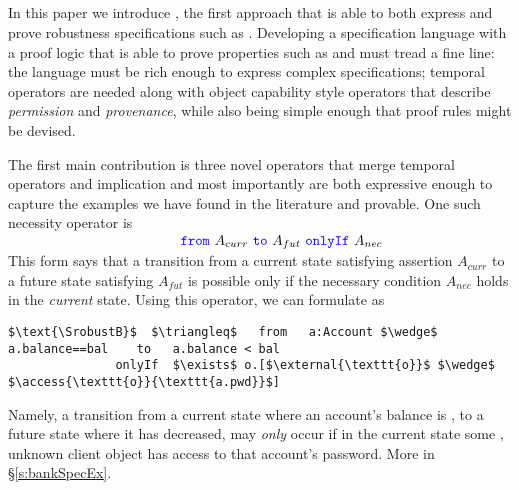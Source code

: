 \subsection{\Nec}
\label{intro:this:work}
{In this paper we introduce \Nec,} the first approach that is able to  both express and prove
robustness specifications such as  \SrobustB.
{Developing a specification language with a proof logic that is able to prove properties such as \SrobustB %
and must tread a fine line: the language must be rich enough to express complex specifications; temporal operators are needed along with object capability style operators 
that describe \emph{permission} and \emph{provenance}, while also being simple enough that proof rules might be devised.}


\vspace{.07in}
 {
The {first main} contribution  
{is} three novel operators that merge
temporal operators and implication 
and most importantly are both expressive enough to capture the 
examples we have found in the literature and provable.
}
%
%
%  
 One such necessity operator is \\
$ 
\strut \hspace{1.7in} {\color{blue}\texttt{from}}\ A_{curr}\ {\color{blue}\texttt{to}}\ A_{fut}\ {\color{blue}\texttt{onlyIf}}\ A_{nec}
$  
\\
This form says that  
a  {transition} from a current state satisfying assertion $A_{curr}$ to a future
state satisfying $A_{fut}$  is possible only if  the   necessary 
condition
$A_{nec}$ holds in the \emph{current} state.
Using this operator, 
we can formulate  \SrobustB  
as
\begin{lstlisting}[language = Chainmail, mathescape=true, frame=lines]
   $\text{\SrobustB}$  $\triangleq$   from   a:Account $\wedge$ a.balance==bal    to   a.balance < bal
               onlyIf  $\exists$ o.[$\external{\texttt{o}}$ $\wedge$ $\access{\texttt{o}}{\texttt{a.pwd}}$]
\end{lstlisting}
Namely, a transition from a  {current} state where an account's balance is , to a  {future} state where 
it has decreased, may \emph{only} occur if  {in the current state} some {}, unknown client object  
has access to that account's password.
More    in \S\ref{s:bankSpecEx}. 
 

